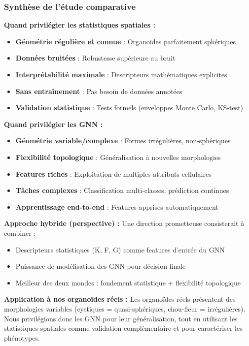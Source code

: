 \subsubsection{Synthèse de l'étude comparative}

\textbf{Quand privilégier les statistiques spatiales :}
\begin{itemize}
    \item \textbf{Géométrie régulière et connue} : Organoïdes parfaitement sphériques
    \item \textbf{Données bruitées} : Robustesse supérieure au bruit
    \item \textbf{Interprétabilité maximale} : Descripteurs mathématiques explicites
    \item \textbf{Sans entraînement} : Pas besoin de données annotées
    \item \textbf{Validation statistique} : Tests formels (enveloppes Monte Carlo, KS-test)
\end{itemize}

\textbf{Quand privilégier les GNN :}
\begin{itemize}
    \item \textbf{Géométrie variable/complexe} : Formes irrégulières, non-sphériques
    \item \textbf{Flexibilité topologique} : Généralisation à nouvelles morphologies
    \item \textbf{Features riches} : Exploitation de multiples attributs cellulaires
    \item \textbf{Tâches complexes} : Classification multi-classes, prédiction continues
    \item \textbf{Apprentissage end-to-end} : Features apprises automatiquement
\end{itemize}

\textbf{Approche hybride (perspective) :}
Une direction prometteuse consisterait à combiner :
\begin{itemize}
    \item Descripteurs statistiques (K, F, G) comme features d'entrée du GNN
    \item Puissance de modélisation des GNN pour décision finale
    \item Meilleur des deux mondes : fondement statistique + flexibilité topologique
\end{itemize}

\textbf{Application à nos organoïdes réels :}
Les organoïdes réels présentent des morphologies variables (cystiques = quasi-sphériques, chou-fleur = irrégulières). Nous privilégions donc les GNN pour leur généralisation, tout en utilisant les statistiques spatiales comme validation complémentaire et pour caractériser les phénotypes.

